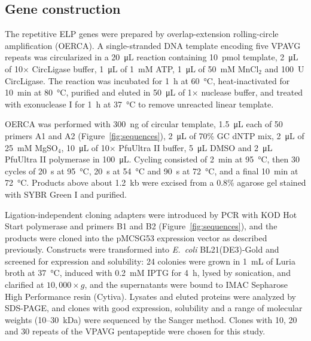 \documentclass[11pt]{article}
\begin{document}
\subsection{Gene construction}

The repetitive ELP genes were prepared by overlap-extension rolling-circle amplification (OERCA).\cite{Amiram2011-la} A single-stranded DNA template encoding five VPAVG repeats was circularized in a \SI{20}{\micro\liter} reaction containing 10~pmol template, \SI{2}{\micro\liter} of 10$\times$ CircLigase buffer, \SI{1}{\micro\liter} of 1~mM ATP, \SI{1}{\micro\liter} of 50~mM MnCl$_2$ and 100~U CircLigase. The reaction was incubated for 1~h at \SI{60}{\degreeCelsius}, heat-inactivated for 10~min at \SI{80}{\degreeCelsius}, purified and eluted in \SI{50}{\micro\liter} of 1$\times$ nuclease buffer, and treated with exonuclease I for 1~h at \SI{37}{\degreeCelsius} to remove unreacted linear template.

OERCA was performed with 300~ng of circular template, \SI{1.5}{\micro\liter} each of \SI{50}{\micro\Molar} primers A1 and A2 (Figure~\ref{fig:sequences}), \SI{2}{\micro\liter} of 70\% GC dNTP mix, \SI{2}{\micro\liter} of 25~mM MgSO$_4$, \SI{10}{\micro\liter} of 10$\times$ PfuUltra II buffer, \SI{5}{\micro\liter} DMSO and \SI{2}{\micro\liter} PfuUltra II polymerase in \SI{100}{\micro\liter}. Cycling consisted of 2~min at \SI{95}{\degreeCelsius}, then 30 cycles of 20~s at \SI{95}{\degreeCelsius}, 20~s at \SI{54}{\degreeCelsius} and 90~s at \SI{72}{\degreeCelsius}, and a final 10~min at \SI{72}{\degreeCelsius}. Products above about 1.2~kb were excised from a 0.8\% agarose gel stained with SYBR Green I and purified.

Ligation-independent cloning adapters were introduced by PCR with KOD Hot Start polymerase and primers B1 and B2 (Figure~\ref{fig:sequences}),\cite{Aslanidis1990-lm} and the products were cloned into the pMCSG53 expression vector\cite{Eschenfeldt2009-bi} as described previously.\cite{Kim2011-rl} Constructs were transformed into \textit{E.~coli} BL21(DE3)-Gold and screened for expression and solubility: 24 colonies were grown in \SI{1}{\milli\liter} of Luria broth at \SI{37}{\degreeCelsius}, induced with 0.2~mM IPTG for 4~h, lysed by sonication, and clarified at $10{,}000\times g$, and the supernatants were bound to IMAC Sepharose High Performance resin (Cytiva). Lysates and eluted proteins were analyzed by SDS-PAGE, and clones with good expression, solubility and a range of molecular weights (10--30~kDa) were sequenced by the Sanger method. Clones with 10, 20 and 30 repeats of the VPAVG pentapeptide were chosen for this study.
\end{document}
